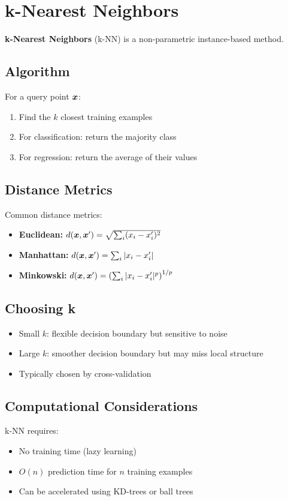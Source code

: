 
\section{k-Nearest Neighbors}
\label{sec:knn}

\textbf{k-Nearest Neighbors} (k-NN) is a non-parametric instance-based method.

\subsection{Algorithm}

For a query point $\boldsymbol{x}$:
\begin{enumerate}
    \item Find the $k$ closest training examples
    \item For classification: return the majority class
    \item For regression: return the average of their values
\end{enumerate}

\subsection{Distance Metrics}

Common distance metrics:
\begin{itemize}
    \item \textbf{Euclidean:} $d(\boldsymbol{x}, \boldsymbol{x}') = \sqrt{\sum_i (x_i - x_i')^2}$
    \item \textbf{Manhattan:} $d(\boldsymbol{x}, \boldsymbol{x}') = \sum_i |x_i - x_i'|$
    \item \textbf{Minkowski:} $d(\boldsymbol{x}, \boldsymbol{x}') = \left(\sum_i |x_i - x_i'|^p\right)^{1/p}$
\end{itemize}

\subsection{Choosing k}

\begin{itemize}
    \item Small $k$: flexible decision boundary but sensitive to noise
    \item Large $k$: smoother decision boundary but may miss local structure
    \item Typically chosen by cross-validation
\end{itemize}

\subsection{Computational Considerations}

k-NN requires:
\begin{itemize}
    \item No training time (lazy learning)
    \item $O(n)$ prediction time for $n$ training examples
    \item Can be accelerated using KD-trees or ball trees
\end{itemize}

